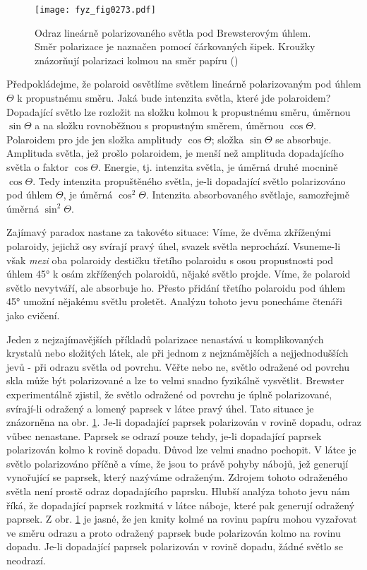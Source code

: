    \begin{figure}[ht!] %
      \centering
      \texttt{[image: fyz\_fig0273.pdf]}
      \caption{Odraz lineárně polarizovaného světla pod Brewsterovým úhlem. Směr polarizace je
               naznačen pomocí čárkovaných šipek. Kroužky znázorňují polarizaci kolmou na směr
               papíru (\cite[s.~427]{Feynman01})}
      \label{fyz:fig0273}
    \end{figure}

    Předpokládejme, že polaroid osvětlíme světlem lineárně polarizovaným pod úhlem \(\varTheta\) k
    propustnému směru. Jaká bude intenzita světla, které jde polaroidem? Dopadající světlo lze
    rozložit na složku kolmou k propustnému směru, úměrnou \(\sin\varTheta\) a na složku rovnoběžnou
    s propustným směrem, úměrnou \(\cos\varTheta\). Polaroidem pro jde jen složka amplitudy
    \(\cos\varTheta\); složka \(\sin\varTheta\) se absorbuje. Amplituda světla, jež prošlo
    polaroidem, je menší než amplituda dopadajícího světla o faktor \(\cos\varTheta\). Energie, tj.
    intenzita světla, je úměrná druhé mocnině \(\cos\varTheta\). Tedy intenzita propuštěného světla,
    je-li dopadající světlo polarizováno pod úhlem \(\varTheta\), je úměrná \(\cos^2\varTheta\).
    Intenzita absorbovaného světlaje, samozřejmě úměrná \(\sin^2\varTheta\).

    Zajímavý paradox nastane za takovéto situace: Víme, že dvěma zkříženými polaroidy, jejichž osy
    svírají pravý úhel, svazek světla neprochází. Vsuneme-li však \emph{mezi} oba polaroidy destičku
    třetího polaroidu s osou propustnosti pod úhlem \ang{45} k osám zkřížených polaroidů, nějaké
    světlo projde. Víme, že polaroid světlo nevytváří, ale absorbuje ho. Přesto přidání třetího
    polaroidu pod úhlem \ang{45} umožní nějakému světlu proletět. Analýzu tohoto jevu ponecháme
    čtenáři jako cvičení.

    Jeden z nejzajímavějších příkladů polarizace nenastává u komplikovaných krystalů nebo složitých
    látek, ale při jednom z nejznámějších a nejjednodušších jevů - při odrazu světla od povrchu.
    Věřte nebo ne, světlo odražené od povrchu skla může být polarizované a lze to velmi snadno
    fyzikálně vysvětlit. Brewster experimentálně zjistil, že světlo odražené od povrchu je úplně
    polarizované, svírají-li odražený a lomený paprsek v látce pravý úhel. Tato situace je
    znázorněna na obr. \ref{fyz:fig0273}. Je-li dopadající paprsek polarizován v rovině dopadu, odraz
    vůbec nenastane. Paprsek se odrazí pouze tehdy, je-li dopadající paprsek polarizován kolmo k
    rovině dopadu. Důvod lze velmi snadno pochopit. V látce je světlo polarizováno příčně a víme, že
    jsou to právě pohyby nábojů, jež generují vynořující se paprsek, který nazýváme odraženým.
    Zdrojem tohoto odraženého světla není prostě odraz dopadajícího paprsku. Hlubší analýza tohoto
    jevu nám říká, že dopadající paprsek rozkmitá v látce náboje, které pak generují odražený
    paprsek. Z obr. \ref{fyz:fig0273} je jasné, že jen kmity kolmé na rovinu papíru mohou vyzařovat
    ve směru odrazu a proto odražený paprsek bude polarizován kolmo na rovinu dopadu. Je-li
    dopadající paprsek polarizován v rovině dopadu, žádné světlo se neodrazí.

